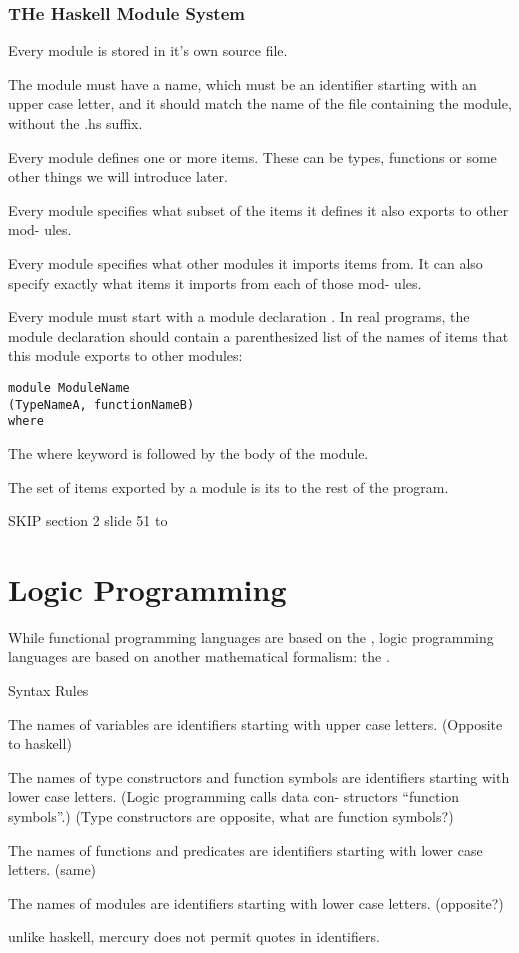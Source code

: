 \subsubsection{THe Haskell Module System}
\begin{compactitem}
\item Every module is stored in it's own source file. 
\item The module must have a name, which must be an
identifier starting with an upper case letter, and it
should match the name of the file containing the
module, without the .hs suffix.
\item Every module defines one or more items. These
can be types, functions or some other things we
will introduce later.
\item Every module specifies what subset of the
items it defines it also exports to other mod-
ules.
\item Every module specifies what other modules it
imports items from. It can also specify exactly
what items it imports from each of those mod-
ules. 
\item Every module must start with a module declaration . In real programs, the module declaration should
contain a parenthesized list of the names of items
that this module exports to other modules:
\begin{lstlisting}
module ModuleName
(TypeNameA, functionNameB)
where
\end{lstlisting}
The where keyword is followed by the body of the module.
\item The set of items exported by a module is its  to the rest of the program.
\end{compactitem}

SKIP section 2 slide 51 to 
\section{Logic Programming}
While functional programming languages are based
on the , logic programming languages are based on another mathematical formalism: the .

Syntax Rules
\begin{compactitem}
\item The names of variables are identifiers starting
with upper case letters. (Opposite to haskell)
\item The names of type constructors and function
symbols are identifiers starting with lower case
letters. (Logic programming calls data con-
structors “function symbols”.) (Type constructors are opposite, what are function symbols?)
\item The names of functions and predicates are
identifiers starting with lower case letters. (same)
\item  The names of modules are identifiers starting
with lower case letters. (opposite?)
\item unlike haskell, mercury does not permit quotes in identifiers.
\end{compactitem}

